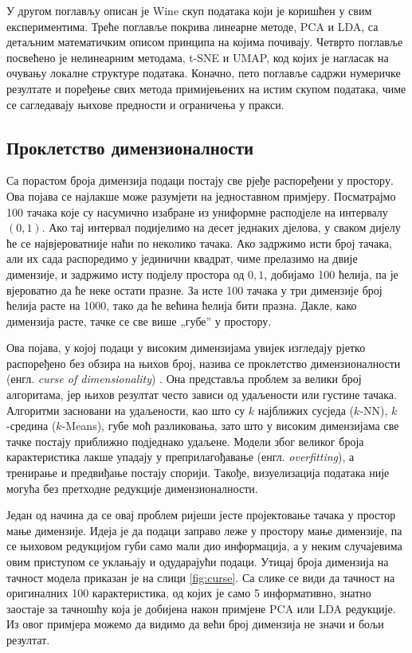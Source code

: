 \documentclass{article}
\begin{document}
	У другом поглављу описан је Wine скуп података који је коришћен у свим експериментима. Треће поглавље покрива линеарне методе, PCA и LDA, са детаљним математичким описом принципа на којима почивају. Четврто поглавље посвећено је нелинеарним методама, t-SNE и UMAP, код којих је нагласак на очувању локалне структуре података. Коначно, пето поглавље садржи нумеричке резултате и поређење свих метода примијењених на истим скупом података, чиме се сагледавају њихове предности и ограничења у пракси.
	
	
	\subsection{Проклетство димензионалности}
	
	Са порастом броја димензија подаци постају све рјеђе распоређени у простору. Ова појава се најлакше може разумјети на једноставном примјеру. Посматрајмо 100 тачака које су насумично изабране из униформне расподјеле на интервалу $(0,1)$. Ако тај интервал подијелимо на десет једнаких дјелова, у сваком дијелу ће се највјероватније наћи по неколико тачака. Ако задржимо исти број тачака, али их сада распоредимо у јединични квадрат, чиме прелазимо на двије димензије, и задржимо исту подјелу простора од $0{,}1$, добијамо 100 ћелија, па је вјероватно да ће неке остати празне. За исте 100 тачака у три димензије број ћелија расте на 1000, тако да ће већина ћелија бити празна. Дакле, како димензија расте, тачке се све више „губе'' у простору.
	
	Ова појава, у којој подаци у високим димензијама увијек изгледају рјетко распоређено без обзира на њихов број, назива се проклетство димензионалности (енгл. \textit{curse of dimensionality}) \cite{bishop2006}. Она представља проблем за велики број алгоритама, јер њихов резултат често зависи од удаљености или густине тачака. Алгоритми засновани на удаљености, као што су $k$ најближих сусједа ($k$-NN), $k$-средина ($k$-Means), губе моћ разликовања, зато што у високим димензијама све тачке постају приближно подједнако удаљене. Модели због великог броја карактеристика лакше упадају у преприлагођавање (енгл. \textit{overfitting}), а тренирање и предвиђање постају спорији. Такође, визуелизација података није могућа без претходне редукције димензионалности.
	
	Један од начина да се овај проблем ријеши јесте пројектовање тачака у простор мање димензије. Идеја је да подаци заправо леже у простору мање димензије, па се њиховом редукцијом губи само мали дио информација, а у неким случајевима овим приступом се уклањају и одударајући подаци. Утицај броја димензија на тачност модела приказан је на слици \ref{fig:curse}. Са слике се види да тачност на оригиналних 100 карактеристика, од којих је само 5 информативно, знатно заостаје за тачношћу која је добијена након примјене PCA или LDA редукције. Из овог примјера можемо да видимо да већи број димензија не значи и бољи резултат.
	
\end{document}

